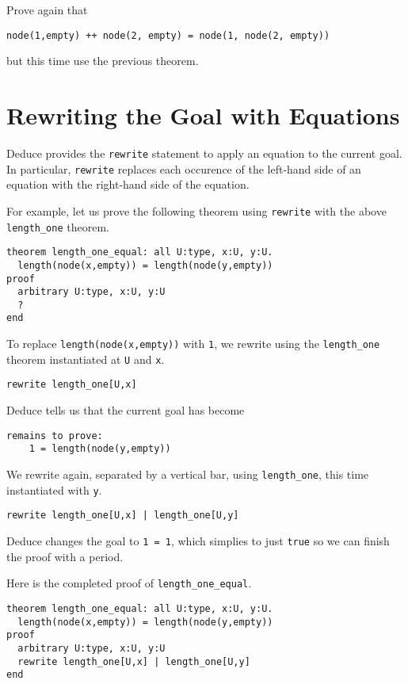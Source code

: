 \documentclass[12pt]{article}
\begin{document}
\noindent Prove again that 
\begin{verbatim}
node(1,empty) ++ node(2, empty) = node(1, node(2, empty))
\end{verbatim}
but this time use the previous theorem.

\section{Rewriting the Goal with Equations}

Deduce provides the \texttt{rewrite} statement to apply an equation to the
current goal. In particular, \texttt{rewrite} replaces each occurence of the
left-hand side of an equation with the right-hand side of the
equation.

For example, let us prove the following theorem using \texttt{rewrite}
with the above \texttt{length\_one} theorem.

\begin{verbatim}
theorem length_one_equal: all U:type, x:U, y:U.
  length(node(x,empty)) = length(node(y,empty))
proof
  arbitrary U:type, x:U, y:U
  ?
end
\end{verbatim}

To replace \texttt{length(node(x,empty))} with \texttt{1}, we rewrite
using the \texttt{length\_one} theorem instantiated at \texttt{U} and \texttt{x}.

\begin{verbatim}
rewrite length_one[U,x]
\end{verbatim}

\noindent Deduce tells us that the current goal has become

\begin{verbatim}
remains to prove:
	1 = length(node(y,empty))
\end{verbatim}

\noindent We rewrite again, separated by a vertical bar, using
\texttt{length\_one}, this time instantiated with \texttt{y}.

\begin{verbatim}
rewrite length_one[U,x] | length_one[U,y]
\end{verbatim}

\noindent Deduce changes the goal to \texttt{1 = 1}, which simplies to
just \texttt{true} so we can finish the proof with a period.

Here is the completed proof of \texttt{length\_one\_equal}.

\begin{verbatim}
theorem length_one_equal: all U:type, x:U, y:U.
  length(node(x,empty)) = length(node(y,empty))
proof
  arbitrary U:type, x:U, y:U
  rewrite length_one[U,x] | length_one[U,y]
end
\end{verbatim}
\end{document}
